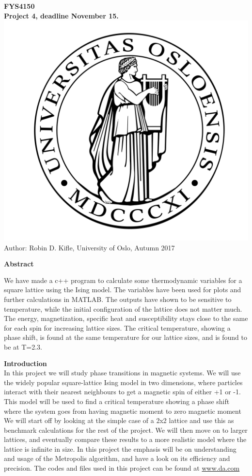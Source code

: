 \documentclass[10pt,a4paper]{article}
\begin{document}
\begin{center}
{\LARGE\bf
FYS4150\\
Project 4, deadline November 15.
}
 \includegraphics[scale=0.075]{uio.png}\\
Author: Robin D. Kifle,
University of Oslo, Autumn 2017

\vspace{3cm}
{\LARGE\bf
Abstract
}
\end{center}
We have made a c++ program to calculate some thermodynamic variables for a square lattice using the Ising model. The variables have been used for plots and further calculations in MATLAB. The outputs have shown to be sensitive to temperature, while the initial configuration of the lattice does not matter much. The energy, magnetization, specific heat and susceptibility stays close to the same for each spin for increasing lattice sizes. The critical temperature, showing a phase shift, is found at the same temperature for our lattice sizes, and is found to be at T=2.3.

\newpage

{\LARGE\bf
Introduction
}\\
In this project we will study phase transitions in magnetic systems. We will use the widely popular square-lattice Ising model in two dimensions, where particles interact with their nearest neighbours to get a magnetic spin of either +1 or -1. This model will be used to find a critical temperature showing a phase shift where the system goes from having magnetic moment to zero magnetic moment We will start off by looking at the simple case of a 2x2 lattice and use this as benchmark calculations for the rest of the project. We will then move on to larger lattices, and eventually compare these results to a more realistic model where the lattice is infinite in size. In this project the emphasis will be on understanding and usage of the Metropolis algorithm, and have a look on its efficiency and precision.
The codes and files used in this project can be found at \url{www.da.com}
\\
\newpage
\end{document}
